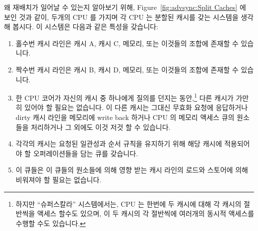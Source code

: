\begin{enumerate}
왜 재배치가 일어날 수 있는지 알아보기 위해, Figure~\ref{fig:advsync:Split
Caches} 에 보인 것과 같이, 두개의 CPU 를 가지며 각 CPU 는 분할된 캐시를 갖는
시스템을 생각해 봅시다.
이 시스템은 다음과 같은 특성을 갖습니다:
\begin{enumerate}
\item	홀수번 캐시 라인은 캐시 A, 캐시 C, 메모리, 또는 이것들의 조합에 존재할
	수 있습니다.
\item	짝수번 캐시 라인은 캐시 B, 캐시 D, 메모리, 또는 이것들의 조합에 존재할
	수 있습니다.
\item	한 CPU 코어가 자신의 캐시 중 하나에게 질의를 던지는 동안,\footnote{
		하지만 ``슈퍼스칼라'' 시스템에서는, CPU 는 한번에 두 캐시에
		대해 각 캐시의 절반씩을 액세스 할수도 있으며, 이 두 캐시의 각
		절반씩에 여러개의 동시적 액세스를 수행할 수도 있습니다.}
	다른 캐시가 가만히 있어야 할 필요는 없습니다.
	이 다른 캐시는 그대신 무효화 요청에 응답하거나 dirty 캐시 라인을
	메모리에 write back 하거나 CPU 의 메모리 액세스 큐의 원소들을
	처리하거나 그 외에도 이것 저것 할 수 있습니다.
\item	각각의 캐시는 요청된 일관성과 순서 규칙을 유지하기 위해 해당 캐시에
	적용되어야 할 오퍼레이션들을 담는 큐를 갖습니다.
\item	이 큐들은 이 큐들의 원소들에 의해 영향 받는 캐시 라인의 로드와 스토어에
	의해 비워져야 할 필요는 없습니다.
\end{enumerate}

\end{enumerate}
